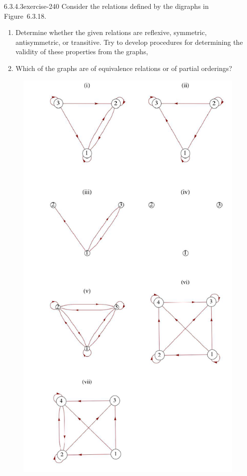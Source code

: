 \documentclass[twoside,10pt,]{book}
\numberwithin{equation}{section}
\begin{document}
\begin{divisionsolution}{6.3.4.3}{}{exercise-240}%
\hypertarget{p-2059}{}%
Consider the relations defined by the digraphs in Figure~6.3.18.\leavevmode%
\begin{enumerate}[label=(\alph*)]
\item\hypertarget{li-1084}{}\hypertarget{p-2060}{}%
Determine whether the given relations are reflexive, symmetric, antisymmetric, or transitive. Try to develop procedures for determining the validity of these properties from the graphs,%
\item\hypertarget{li-1085}{}\hypertarget{p-2061}{}%
Which of the graphs are of equivalence relations or of partial orderings?%
\end{enumerate}
%
\begin{figure}
\centering
\includegraphics[width=1\linewidth]{images/exercises-6-digraphs.png}

\end{figure}
\end{divisionsolution}
\end{document}
